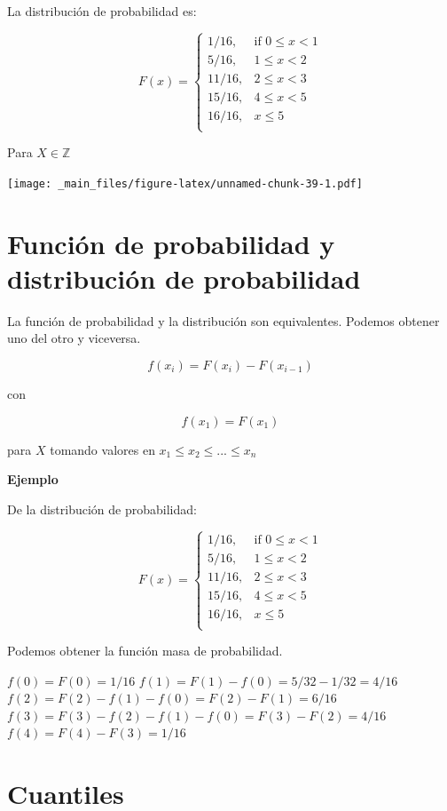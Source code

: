 \documentclass[
]{book}
\begin{document}
La distribución de probabilidad es:

\[
    F(x)=
\begin{cases}
    1/16,& \text{if } 0 \leq x < 1\\
    5/16,& 1\leq x < 2\\
    11/16,& 2\leq x < 3\\
    15/16,& 4\leq x < 5\\
    16/16,&  x \leq 5\\
\end{cases}
\]

Para \(X \in \mathbb{Z}\)

\texttt{[image: \_main\_files/figure-latex/unnamed-chunk-39-1.pdf]}

\hypertarget{funciuxf3n-de-probabilidad-y-distribuciuxf3n-de-probabilidad}{%
\section{Función de probabilidad y distribución de probabilidad}\label{funciuxf3n-de-probabilidad-y-distribuciuxf3n-de-probabilidad}}

La función de probabilidad y la distribución son equivalentes. Podemos obtener uno del otro y viceversa.

\[f(x_i)=F(x_i)-F(x_{i-1})\]

con

\[f(x_1)=F(x_1)\]

para \(X\) tomando valores en \(x_1 \leq x_2 \leq ... \leq x_n\)

\textbf{Ejemplo}

De la distribución de probabilidad:

\[
    F(x)=
\begin{cases}
    1/16,& \text{if } 0 \leq x < 1\\
    5/16,& 1\leq x < 2\\
    11/16,& 2\leq x < 3\\
    15/16,& 4\leq x < 5\\
    16/16,&  x \leq 5\\
\end{cases}
\]

Podemos obtener la función masa de probabilidad.

\(f(0)=F(0)=1/16\)
\(f(1)=F(1)-f(0)=5/32-1/32=4/16\)
\(f(2)=F(2)-f(1)-f(0)=F(2)-F(1)=6/16\)
\(f(3)=F(3)-f(2)-f(1)-f(0)=F(3)-F(2)=4/16\)
\(f(4)=F(4)-F(3)=1/16\)

\hypertarget{cuantiles}{%
\section{Cuantiles}\label{cuantiles}}
\end{document}
